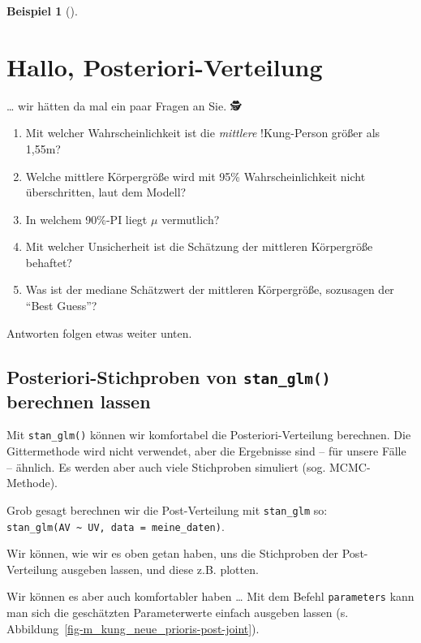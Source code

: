 \documentclass[
  ngerman,
  letterpaper,
  twoside,
  open=any]{scrbook}
\providecommand{\tightlist}{%
  \setlength{\itemsep}{0pt}\setlength{\parskip}{0pt}}\usepackage{longtable,booktabs,array}
\theoremstyle{definition}
\newtheorem{example}{Beispiel}[chapter]
\theoremstyle{plain}
\theoremstyle{definition}
\theoremstyle{definition}
\theoremstyle{remark}
\begin{document}
\begin{example}[]
\section{Hallo,
Posteriori-Verteilung}\label{hallo-posteriori-verteilung}

\ldots{} wir hätten da mal ein paar Fragen an Sie. 🕵

\begin{enumerate}
\def\labelenumi{\arabic{enumi}.}
\tightlist
\item
  Mit welcher Wahrscheinlichkeit ist die \emph{mittlere} !Kung-Person
  größer als 1,55m?
\item
  Welche mittlere Körpergröße wird mit 95\% Wahrscheinlichkeit nicht
  überschritten, laut dem Modell?
\item
  In welchem 90\%-PI liegt \(\mu\) vermutlich?
\item
  Mit welcher Unsicherheit ist die Schätzung der mittleren Körpergröße
  behaftet?
\item
  Was ist der mediane Schätzwert der mittleren Körpergröße, sozusagen
  der \enquote{Best Guess}?
\end{enumerate}

Antworten folgen etwas weiter unten.

\subsection{\texorpdfstring{Posteriori-Stichproben von
\texttt{stan\_glm()} berechnen
lassen}{Posteriori-Stichproben von stan\_glm() berechnen lassen}}\label{posteriori-stichproben-von-stan_glm-berechnen-lassen}

Mit \texttt{stan\_glm()} können wir komfortabel die
Posteriori-Verteilung berechnen. Die Gittermethode wird nicht verwendet,
aber die Ergebnisse sind -- für unsere Fälle -- ähnlich. Es werden aber
auch viele Stichproben simuliert (sog. MCMC-Methode).

Grob gesagt berechnen wir die Post-Verteilung mit \texttt{stan\_glm} so:
\texttt{stan\_glm(AV\ \textasciitilde{}\ UV,\ data\ =\ meine\_daten)}.

Wir können, wie wir es oben getan haben, uns die Stichproben der
Post-Verteilung ausgeben lassen, und diese z.B. plotten.

Wir können es aber auch komfortabler haben \ldots{} Mit dem Befehl
\texttt{parameters} kann man sich die geschätzten Parameterwerte einfach
ausgeben lassen (s. Abbildung~\ref{fig-m_kung_neue_prioris-post-joint}).


\end{example}
\end{document}
